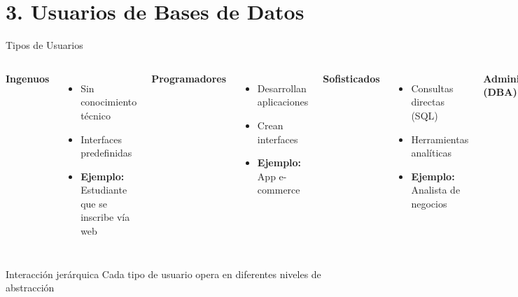 \documentclass{beamer}
\begin{document}
\section{3. Usuarios de Bases de Datos}
\begin{frame}{Tipos de Usuarios}
\begin{columns}[T]
\textbf{Ingenuos}
\begin{itemize}
    \item Sin conocimiento técnico
    \item Interfaces predefinidas
    \item \textbf{Ejemplo:} 
    Estudiante que se inscribe vía web
\end{itemize}

\textbf{Programadores}
\begin{itemize}
    \item Desarrollan aplicaciones
    \item Crean interfaces
    \item \textbf{Ejemplo:} 
    App e-commerce
\end{itemize}

\textbf{Sofisticados}
\begin{itemize}
    \item Consultas directas (SQL)
    \item Herramientas analíticas
    \item \textbf{Ejemplo:} 
    Analista de negocios
\end{itemize}

\textbf{Administradores (DBA)}
\begin{itemize}
    \item Gestión centralizada
    \item Seguridad y eficiencia
    \item \textbf{Rol:} 
    Mantenimiento global
\end{itemize}
\end{columns}

\begin{block}{Interacción jerárquica}
Cada tipo de usuario opera en diferentes niveles de abstracción
\end{block}
\end{frame}
\end{document}
